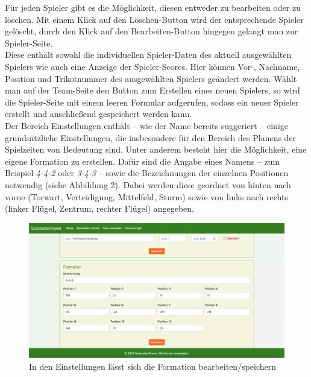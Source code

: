 Für jeden Spieler gibt es die Möglichkeit, diesen entweder zu bearbeiten oder zu löschen. 
Mit einem Klick auf den Löschen-Button wird der entsprechende Spieler gelöscht, durch den 
Klick auf den Bearbeiten-Button hingegen gelangt man zur Spieler-Seite. \\ 
Diese enthält sowohl die individuellen Spieler-Daten des aktuell ausgewählten Spielers 
wie auch eine Anzeige der Spieler-Scores. Hier können Vor-, Nachname, Position und 
Trikotnummer des ausgewählten Spielers geändert werden. Wählt man auf der Team-Seite den 
Button zum Erstellen eines neuen Spielers, so wird die Spieler-Seite mit einem leeren 
Formular aufgerufen, sodass ein neuer Spieler erstellt und anschließend gespeichert 
werden kann. \\ 
Der Bereich Einstellungen enthält -- wie der Name bereits suggeriert -- einige 
grundsätzliche Einstellungen, die insbesondere für den Bereich des Planens der 
Spielzeiten von Bedeutung sind. Unter anderem besteht hier die Möglichkeit, eine 
eigene Formation zu erstellen. Dafür sind die Angabe eines Namens -- zum Beispiel 
\textit{4-4-2} oder \textit{3-4-3} -- sowie die Bezeichnungen der einzelnen 
Positionen notwendig (siehe Abbildung 2). Dabei werden diese geordnet von hinten nach 
vorne (Torwart, Verteidigung, Mittelfeld, Sturm) sowie von links nach rechts (linker 
Flügel, Zentrum, rechter Flügel) angegeben. \\ 

\begin{figure}[h]
  \centering
  \includegraphics[width=\textwidth]{screenshots/formation.png}
  \caption{In den Einstellungen lässt sich die Formation bearbeiten/speichern}
  \label{fig:formation}
\end{figure}

